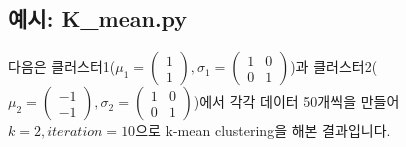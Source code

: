 \documentclass{oblivoir}
\begin{document}
  \subsection{예시: K\_mean.py}
  다음은 클러스터1($\mu_1=\begin{pmatrix}1\\1\end{pmatrix},\sigma_1=\begin{pmatrix}1 & 0 \\ 0 & 1\end{pmatrix}$)과
  클러스터2($\mu_2=\begin{pmatrix}-1\\-1\end{pmatrix},\sigma_2=\begin{pmatrix}1 & 0 \\ 0 & 1\end{pmatrix}$)에서
  각각 데이터 50개씩을 만들어 $k=2,iteration=10$으로 k-mean clustering을 해본 결과입니다.
\end{document}
